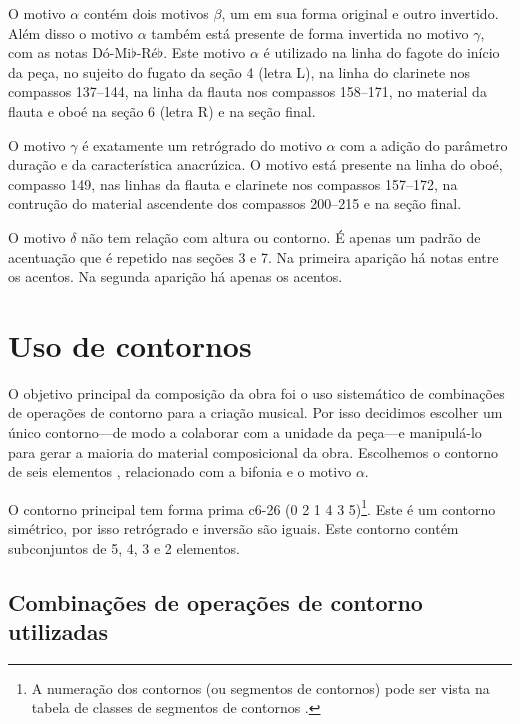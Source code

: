 O motivo $\alpha$ contém dois motivos $\beta$, um em sua forma
original e outro invertido. Além disso o motivo $\alpha$ também está
presente de forma invertida no motivo $\gamma$, com as notas
Dó-Mi$\flat$-Ré$\flat$. Este motivo $\alpha$ é utilizado na linha do
fagote do início da peça, no sujeito do fugato da seção 4 (letra L),
na linha do clarinete nos compassos 137--144, na linha da flauta nos
compassos 158--171, no material da flauta e oboé na seção 6 (letra R)
e na seção final.

O motivo $\gamma$ é exatamente um retrógrado do motivo $\alpha$ com a
adição do parâmetro duração e da característica anacrúzica. O motivo
está presente na linha do oboé, compasso 149, nas linhas da flauta e
clarinete nos compassos 157--172, na contrução do material ascendente
dos compassos 200--215 e na seção final.

O motivo $\delta$ não tem relação com altura ou contorno. É apenas um
padrão de acentuação que é repetido nas seções 3 e 7. Na primeira
aparição há notas  entre os acentos. Na segunda aparição
há apenas os acentos.

\section{Uso de contornos}
\label{sec:uso-de-contornos}

O objetivo principal da composição da obra \obra{} foi o uso
sistemático de combinações de operações de contorno para a criação
musical. Por isso decidimos escolher um único contorno---de modo a
colaborar com a unidade da peça---e manipulá-lo para gerar a maioria
do material composicional da obra. Escolhemos o contorno de seis
elementos \contpr{}, relacionado com a bifonia e o motivo $\alpha$.

O contorno principal \contpr{} tem forma prima c6-26 (0 2 1 4 3
5)\footnote{A numeração dos contornos (ou segmentos de contornos) pode
  ser vista na tabela de classes de segmentos de contornos
  \cite{marvin.ea87:relating}.}. Este é um contorno simétrico, por
isso retrógrado e inversão são iguais. Este contorno contém
subconjuntos de 5, 4, 3 e 2 elementos.

\subsection{Combinações de operações de contorno utilizadas}
\label{sec:comb-de-oper}

